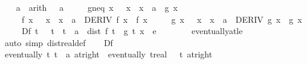 \begin{isabellebody}
\ \ \isamarkupfalse%
\ a\ \ {\isacharbrackleft}{\kern0pt}arith{\isacharbrackright}{\kern0pt}{\isacharcolon}{\kern0pt}\ {\isachardoublequoteopen}{}\ {\isacharless}{\kern0pt}\ a{\isachardoublequoteclose}\isanewline
\ \ \ \ \ g{\isacharprime}{\kern0pt}{\isacharunderscore}{\kern0pt}neq{\isacharunderscore}{\kern0pt}{}{\isacharcolon}{\kern0pt}\ {\isachardoublequoteopen}{\isasymAnd}x{\isachardot}{\kern0pt}\ {}\ {\isacharless}{\kern0pt}\ x\ {\isasymLongrightarrow}\ x\ {\isacharless}{\kern0pt}\ a\ {\isasymLongrightarrow}\ g{\isacharprime}{\kern0pt}\ x\ {\isasymnoteq}\ {}{\isachardoublequoteclose}\isanewline
\ \ \ \ \ f{}{\isacharcolon}{\kern0pt}\ {\isachardoublequoteopen}{\isasymAnd}x{\isachardot}{\kern0pt}\ {}\ {\isacharless}{\kern0pt}\ x\ {\isasymLongrightarrow}\ x\ {\isasymle}\ a\ {\isasymLongrightarrow}\ DERIV\ f\ x\ {\isacharcolon}{\kern0pt}{\isachargreater}{\kern0pt}\ {\isacharparenleft}{\kern0pt}f{\isacharprime}{\kern0pt}\ x{\isacharparenright}{\kern0pt}{\isachardoublequoteclose}\isanewline
\ \ \ \ \ g{}{\isacharcolon}{\kern0pt}\ {\isachardoublequoteopen}{\isasymAnd}x{\isachardot}{\kern0pt}\ {}\ {\isacharless}{\kern0pt}\ x\ {\isasymLongrightarrow}\ x\ {\isasymle}\ a\ {\isasymLongrightarrow}\ DERIV\ g\ x\ {\isacharcolon}{\kern0pt}{\isachargreater}{\kern0pt}\ {\isacharparenleft}{\kern0pt}g{\isacharprime}{\kern0pt}\ x{\isacharparenright}{\kern0pt}{\isachardoublequoteclose}\isanewline
\ \ \ \ \ Df{\isacharcolon}{\kern0pt}\ {\isachardoublequoteopen}{\isasymAnd}t{\isachardot}{\kern0pt}\ {}\ {\isacharless}{\kern0pt}\ t\ {\isasymLongrightarrow}\ t\ {\isacharless}{\kern0pt}\ a\ {\isasymLongrightarrow}\ dist\ {\isacharparenleft}{\kern0pt}f{\isacharprime}{\kern0pt}\ t\ {\isacharslash}{\kern0pt}\ g{\isacharprime}{\kern0pt}\ t{\isacharparenright}{\kern0pt}\ x\ {\isacharless}{\kern0pt}\ e\ {\isacharslash}{\kern0pt}\ {}{\isachardoublequoteclose}\isanewline
\ \ \ \ \isamarkupfalse%
\ eventually{\isacharunderscore}{\kern0pt}at{\isacharunderscore}{\kern0pt}le\ \isamarkupfalse%
\ {\isacharparenleft}{\kern0pt}auto\ simp{\isacharcolon}{\kern0pt}\ dist{\isacharunderscore}{\kern0pt}real{\isacharunderscore}{\kern0pt}def{\isacharparenright}{\kern0pt}\isanewline
\isanewline
\ \ \isamarkupfalse%
\ Df\ \isamarkupfalse%
\ {\isachardoublequoteopen}eventually\ {\isacharparenleft}{\kern0pt}{\isasymlambda}t{\isachardot}{\kern0pt}\ t\ {\isacharless}{\kern0pt}\ a{\isacharparenright}{\kern0pt}\ {\isacharparenleft}{\kern0pt}at{\isacharunderscore}{\kern0pt}right\ {}{\isacharparenright}{\kern0pt}{\isachardoublequoteclose}\ {\isachardoublequoteopen}eventually\ {\isacharparenleft}{\kern0pt}{\isasymlambda}t{\isacharcolon}{\kern0pt}{\isacharcolon}{\kern0pt}real{\isachardot}{\kern0pt}\ {}\ {\isacharless}{\kern0pt}\ t{\isacharparenright}{\kern0pt}\ {\isacharparenleft}{\kern0pt}at{\isacharunderscore}{\kern0pt}right\ {}{\isacharparenright}{\kern0pt}{\isachardoublequoteclose}\isanewline

\end{isabellebody}
